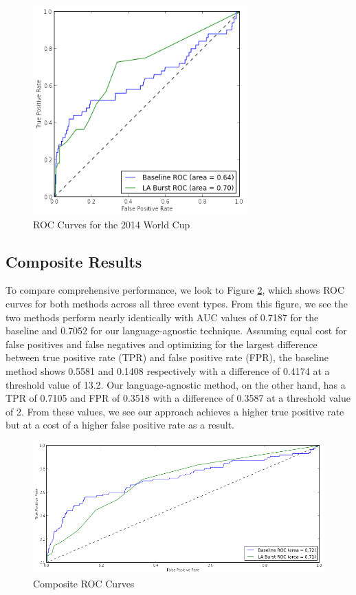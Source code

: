 \documentclass{acm_proc_article-sp}
\begin{document}
\begin{figure}[hbtp]
\begin{center}
\includegraphics[width=3.25in]{./figures/roc_2014_WorldCup.png}
\caption{ROC Curves for the 2014 World Cup}
\label{fig:roc2014WorldCup}
\end{center}
\end{figure}

\subsection{Composite Results}

To compare comprehensive performance, we look to Figure \ref{fig:rocComprehensive}, which shows ROC curves for both methods across all three event types.
From this figure, we see the two methods perform nearly identically with AUC values of 0.7187 for the baseline and 0.7052 for our language-agnostic technique.
Assuming equal cost for false positives and false negatives and optimizing for the largest difference between true positive rate (TPR) and false positive rate (FPR), the baseline method shows 0.5581 and 0.1408 respectively with a difference of 0.4174 at a threshold value of 13.2.
Our language-agnostic method, on the other hand, has a TPR of 0.7105 and FPR of 0.3518 with a difference of 0.3587 at a threshold value of 2.
From these values, we see our approach achieves a higher true positive rate but at a cost of a higher false positive rate as a result.

\begin{figure}[hbtp]
\begin{center}
\includegraphics[width=6in]{./figures/roc_Comp.png}
\caption{Composite ROC Curves}
\label{fig:rocComprehensive}
\end{center}
\end{figure}
\end{document}
